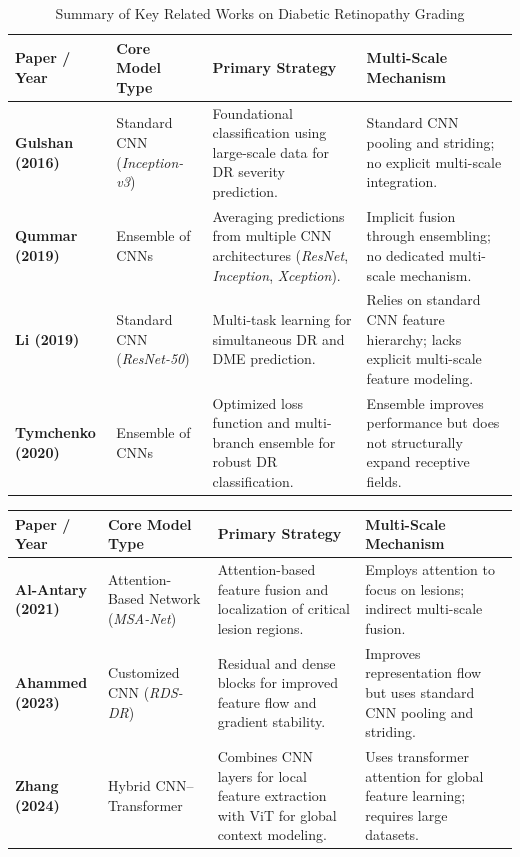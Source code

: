 \documentclass[12pt,a4paper]{article}
\begin{document}
\begin{table}[H]
\centering
\caption{Summary of Key Related Works on Diabetic Retinopathy Grading}
\renewcommand{\arraystretch}{1.4}
\setlength{\tabcolsep}{6pt}
\begin{tabular}{p{3cm} p{4cm} p{4cm} p{4cm}}
\toprule
\textbf{Paper / Year} & \textbf{Core Model Type} & \textbf{Primary Strategy} & \textbf{Multi-Scale Mechanism} \\ 
\midrule

\textbf{Gulshan (2016)} &
Standard CNN (\textit{Inception-v3}) &
Foundational classification using large-scale data for DR severity prediction. &
Standard CNN pooling and striding; no explicit multi-scale integration. \\

\textbf{Qummar (2019)} &
Ensemble of CNNs &
Averaging predictions from multiple CNN architectures (\textit{ResNet}, \textit{Inception}, \textit{Xception}). &
Implicit fusion through ensembling; no dedicated multi-scale mechanism. \\

\textbf{Li (2019)} &
Standard CNN (\textit{ResNet-50}) &
Multi-task learning for simultaneous DR and DME prediction. &
Relies on standard CNN feature hierarchy; lacks explicit multi-scale feature modeling. \\

\textbf{Tymchenko (2020)} &
Ensemble of CNNs &
Optimized loss function and multi-branch ensemble for robust DR classification. &
Ensemble improves performance but does not structurally expand receptive fields. \\

\bottomrule
\end{tabular}
\end{table}

\begin{table}[H]
\centering
\renewcommand{\arraystretch}{1.4}
\setlength{\tabcolsep}{6pt}
\begin{tabular}{p{3cm} p{4cm} p{4cm} p{4cm}}
\toprule
\textbf{Paper / Year} & \textbf{Core Model Type} & \textbf{Primary Strategy} & \textbf{Multi-Scale Mechanism} \\ 
\midrule


\textbf{Al-Antary (2021)} &
Attention-Based Network (\textit{MSA-Net}) &
Attention-based feature fusion and localization of critical lesion regions. &
Employs attention to focus on lesions; indirect multi-scale fusion. \\

\textbf{Ahammed (2023)} &
Customized CNN (\textit{RDS-DR}) &
Residual and dense blocks for improved feature flow and gradient stability. &
Improves representation flow but uses standard CNN pooling and striding. \\

\textbf{Zhang (2024)} &
Hybrid CNN–Transformer &
Combines CNN layers for local feature extraction with ViT for global context modeling. &
Uses transformer attention for global feature learning; requires large datasets. \\

\bottomrule
\end{tabular}
\end{table}
\end{document}
